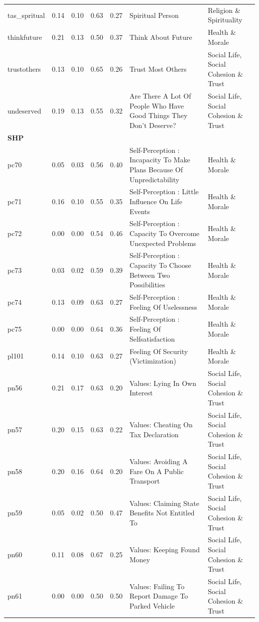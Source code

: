 \documentclass[
  12pt,
]{article}
\begin{document}
\begin{landscape}
\begin{scriptsize}
\begin{longtable}{|p{1.75in}|p{0.3in}|p{0.3in}|p{0.3in}|p{0.3in}|p{2.5in}|p{2.5in}}
tas\_spritual & 0.14 & 0.10 & 0.63 & 0.27 & Spiritual Person & Religion \& Spirituality \\ 
thinkfuture & 0.21 & 0.13 & 0.50 & 0.37 & Think About Future & Health \& Morale \\ 
trustothers & 0.13 & 0.10 & 0.65 & 0.26 & Trust Most Others & Social Life, Social Cohesion \& Trust \\ 
undeserved & 0.19 & 0.13 & 0.55 & 0.32 & Are There A Lot Of People Who Have Good Things They Don't Deserve? & Social Life, Social Cohesion \& Trust \\ 
\midrule
\multicolumn{7}{l}{\textbf{SHP}} \\ 
\midrule
pc70 & 0.05 & 0.03 & 0.56 & 0.40 & Self-Perception : Incapacity To Make Plans Because Of Unpredictability & Health \& Morale \\ 
pc71 & 0.16 & 0.10 & 0.55 & 0.35 & Self-Perception : Little Influence On Life Events & Health \& Morale \\ 
pc72 & 0.00 & 0.00 & 0.54 & 0.46 & Self-Perception : Capacity To Overcome Unexpected Problems & Health \& Morale \\ 
pc73 & 0.03 & 0.02 & 0.59 & 0.39 & Self-Perception : Capacity To Choose Between Two Possibilities & Health \& Morale \\ 
pc74 & 0.13 & 0.09 & 0.63 & 0.27 & Self-Perception : Feeling Of Uselessness & Health \& Morale \\ 
pc75 & 0.00 & 0.00 & 0.64 & 0.36 & Self-Perception : Feeling Of Selfsatisfaction & Health \& Morale \\ 
pl101 & 0.14 & 0.10 & 0.63 & 0.27 & Feeling Of Security (Victimization) & Health \& Morale \\ 
pn56 & 0.21 & 0.17 & 0.63 & 0.20 & Values: Lying In Own Interest & Social Life, Social Cohesion \& Trust \\ 
pn57 & 0.20 & 0.15 & 0.63 & 0.22 & Values: Cheating On Tax Declaration & Social Life, Social Cohesion \& Trust \\ 
pn58 & 0.20 & 0.16 & 0.64 & 0.20 & Values: Avoiding A Fare On A Public Transport & Social Life, Social Cohesion \& Trust \\ 
pn59 & 0.05 & 0.02 & 0.50 & 0.47 & Values: Claiming State Benefits Not Entitled To & Social Life, Social Cohesion \& Trust \\ 
pn60 & 0.11 & 0.08 & 0.67 & 0.25 & Values: Keeping Found Money & Social Life, Social Cohesion \& Trust \\ 
pn61 & 0.00 & 0.00 & 0.50 & 0.50 & Values: Failing To Report Damage To Parked Vehicle & Social Life, Social Cohesion \& Trust \\ 

\end{longtable}
\end{scriptsize}
\end{landscape}
\end{document}
